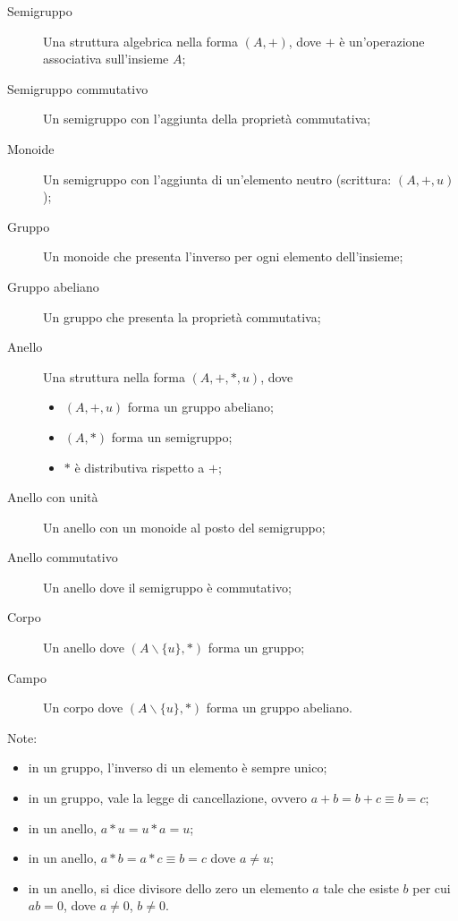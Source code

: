 \documentclass[10pt]{article}
\begin{document}
        \begin{description}
            
            \item[Semigruppo] Una struttura algebrica nella forma \((A, +)\), dove \(+\) è un'operazione associativa sull'insieme \(A\);
            \item[Semigruppo commutativo] Un semigruppo con l'aggiunta della proprietà commutativa;
            \item[Monoide] Un semigruppo con l'aggiunta di un'elemento neutro (scrittura: \((A, +, u)\));
            \item[Gruppo] Un monoide che presenta l'inverso per ogni elemento dell'insieme;
            \item[Gruppo abeliano] Un gruppo che presenta la proprietà commutativa;
            \item[Anello] Una struttura nella forma \((A, +, *, u)\), dove
                \begin{itemize}
                    \item \((A, +, u)\) forma un gruppo abeliano;
                    \item \((A, *)\) forma un semigruppo;
                    \item \(*\) è distributiva rispetto a \(+\);
                \end{itemize}
            \item[Anello con unità] Un anello con un monoide al posto del semigruppo;
            \item[Anello commutativo] Un anello dove il semigruppo è commutativo;
            \item[Corpo] Un anello dove \((A \backslash \{u\}, *)\) forma un gruppo;
            \item[Campo] Un corpo dove \((A \backslash \{u\}, *)\) forma un gruppo abeliano.

        \end{description}

        Note:
        \begin{itemize}
            \item in un gruppo, l'inverso di un elemento è sempre unico;
            \item in un gruppo, vale la legge di cancellazione, ovvero \(a + b = b + c \equiv b = c\);
            \item in un anello, \(a * u = u * a = u\);
            \item in un anello, \(a * b = a * c \equiv b = c\) dove \(a \neq u\);
            \item in un anello, si dice divisore dello zero un elemento \(a\) tale che esiste \(b\) per
                cui \(ab = 0\), dove \(a \neq 0\), \(b \neq 0\).
        \end{itemize}
\end{document}
